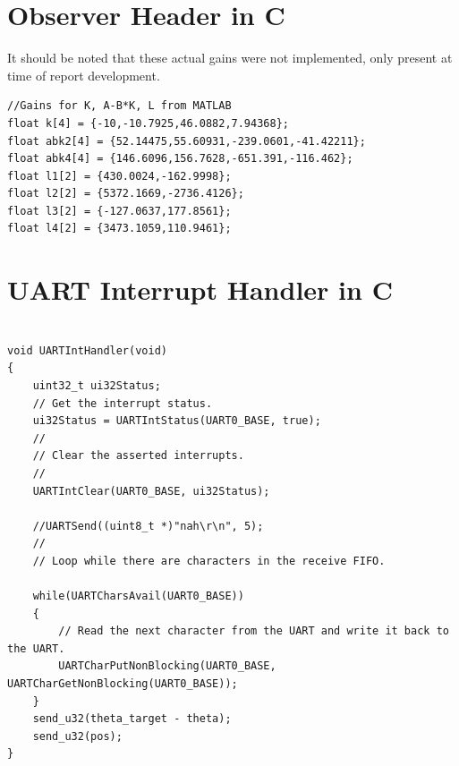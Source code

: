 \documentclass[12pt]{article}
\begin{document}
\section{Observer Header in C}
\label{obsvh}
It should be noted that these actual gains were not implemented, only present at time of report development.
\begin{verbatim}
//Gains for K, A-B*K, L from MATLAB
float k[4] = {-10,-10.7925,46.0882,7.94368};
float abk2[4] = {52.14475,55.60931,-239.0601,-41.42211};
float abk4[4] = {146.6096,156.7628,-651.391,-116.462};
float l1[2] = {430.0024,-162.9998};
float l2[2] = {5372.1669,-2736.4126};
float l3[2] = {-127.0637,177.8561};
float l4[2] = {3473.1059,110.9461};

\end{verbatim}

\section{UART Interrupt Handler in C}
\label{uart}
\begin{verbatim}

void UARTIntHandler(void)
{
    uint32_t ui32Status;
    // Get the interrupt status.
    ui32Status = UARTIntStatus(UART0_BASE, true);
    //
    // Clear the asserted interrupts.
    //
    UARTIntClear(UART0_BASE, ui32Status);

    //UARTSend((uint8_t *)"nah\r\n", 5);
    //
    // Loop while there are characters in the receive FIFO.
    
    while(UARTCharsAvail(UART0_BASE))
    {
        // Read the next character from the UART and write it back to the UART.
        UARTCharPutNonBlocking(UART0_BASE, UARTCharGetNonBlocking(UART0_BASE));
    }
    send_u32(theta_target - theta);
    send_u32(pos);
}
\end{verbatim}
\end{document}
